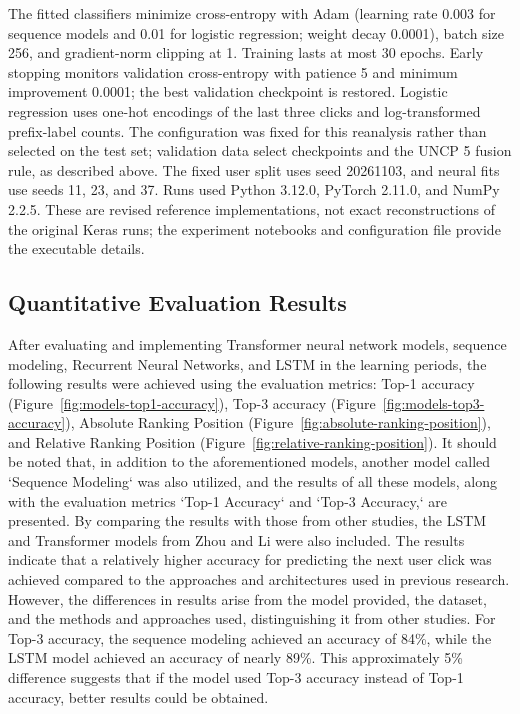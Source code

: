 \documentclass[sn-mathphys-num, Numbered]{sn-jnl}%
\theoremstyle{thmstyleone}%
\theoremstyle{thmstyletwo}%
\theoremstyle{thmstylethree}%
\begin{document}
The fitted classifiers minimize cross-entropy with Adam (learning rate 0.003 for sequence models and 0.01 for logistic regression; weight decay 0.0001), batch size 256, and gradient-norm clipping at 1. Training lasts at most 30 epochs. Early stopping monitors validation cross-entropy with patience 5 and minimum improvement 0.0001; the best validation checkpoint is restored. Logistic regression uses one-hot encodings of the last three clicks and log-transformed prefix-label counts. The configuration was fixed for this reanalysis rather than selected on the test set; validation data select checkpoints and the UNCP 5 fusion rule, as described above. The fixed user split uses seed 20261103, and neural fits use seeds 11, 23, and 37. Runs used Python 3.12.0, PyTorch 2.11.0, and NumPy 2.2.5. These are revised reference implementations, not exact reconstructions of the original Keras runs; the experiment notebooks and configuration file provide the executable details.


\subsection{Quantitative Evaluation Results}

\iffalse
After evaluating and implementing Transformer neural network models, sequence modeling, Recurrent Neural Networks, and LSTM in the learning periods, the following results were achieved using the evaluation metrics: Top-1 accuracy (Figure~\ref{fig:models-top1-accuracy}), Top-3 accuracy (Figure~\ref{fig:models-top3-accuracy}), Absolute Ranking Position (Figure~\ref{fig:absolute-ranking-position}), and Relative Ranking Position (Figure~\ref{fig:relative-ranking-position}). It should be noted that, in addition to the aforementioned models, another model called `Sequence Modeling` was also utilized, and the results of all these models, along with the evaluation metrics `Top-1 Accuracy` and `Top-3 Accuracy,` are presented.
By comparing the results with those from other studies, the LSTM and Transformer models from Zhou and Li were also included. The results indicate that a relatively higher accuracy for predicting the next user click was achieved compared to the approaches and architectures used in previous research. However, the differences in results arise from the model provided, the dataset, and the methods and approaches used, distinguishing it from other studies.
For Top-3 accuracy, the sequence modeling achieved an accuracy of 84\%, while the LSTM model achieved an accuracy of nearly 89\%. This approximately 5\% difference suggests that if the model used Top-3 accuracy instead of Top-1 accuracy, better results could be obtained.
\end{document}
